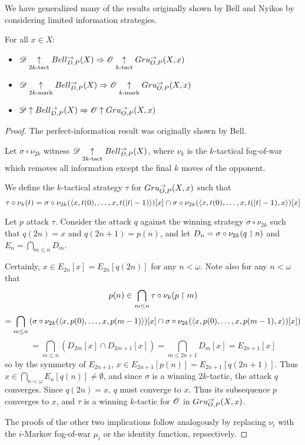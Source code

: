 We have generalized many of the results originally shown by Bell \cite{MR3239205}
and Nyikos \cite{nyikosProximalPreprint} by considering limited information
strategies.

\begin{thm}
For all $x\in X$:
  \begin{itemize}
    \item
      $\mathscr{D}\underset{2k\text{-tact}}{\uparrow} Bell_{D,P}^{\to}(X) \Rightarrow \mathscr{O} \underset{k\text{-tact}}{\uparrow} Gru_{O,P}^{\to}(X,x)$
    \item
      $\mathscr{D}\underset{2k\text{-mark}}{\uparrow} Bell_{D,P}^{\to}(X) \Rightarrow \mathscr{O} \underset{k\text{-mark}}{\uparrow} Gru_{O,P}^{\to}(X,x)$
    \item
      $\mathscr{D}\uparrow Bell_{D,P}^{\to}(X) \Rightarrow \mathscr{O} \uparrow Gru_{O,P}^{\to}(X,x)$
  \end{itemize}
\end{thm}

\begin{proof}
The perfect-information result was originally shown by Bell.

Let $\sigma\circ \nu_{2k}$ witness $\mathscr{D} \underset{2k\text{-tact}}{\uparrow} Bell_{D,P}^{\to}(X)$,
where $\nu_k$ is the $k$-tactical fog-of-war which removes all information
except the final $k$ moves of the opponent.

We define the $k$-tactical strategy $\tau$ for $Gru_{O,P}^{\to}(X,x)$ such that
  \[
    \tau\circ \nu_k(t)
      =
    \sigma\circ \nu_{2k}(\langle x,t(0),\dots,x,t(|t|-1)\rangle)[x]
      \cap
    \sigma\circ \nu_{2k}(\langle x,t(0),\dots,x,t(|t|-1),x\rangle)[x]
  \]

Let $p$ attack $\tau$. Consider the attack $q$ against the winning strategy
$\sigma\circ \nu_{2k}$ such that $q(2n)=x$ and $q(2n+1)=p(n)$, and let
$D_n=\sigma\circ \nu_{2k}(q\restriction n)$ and $E_n=\bigcap_{m\leq n}D_m$.

Certainly, $x\in E_{2n}[x]= E_{2n}[q(2n)]$ for any $n<\omega$.
Note also for any $n<\omega$ that
    \[
      p(n) \in
      \bigcap_{m\leq n}\tau\circ \nu_k(p\restriction m)
    \]
    \[
      =
      \bigcap_{m\leq n}\left(
        \sigma\circ \nu_{2k}(\langle x,p(0),\dots,x,p(m-1)\rangle)[x]\cap
        \sigma\circ \nu_{2k}(\langle x,p(0),\dots,x,p(m-1),x\rangle)[x]
      \right)
    \]
    \[
      =
      \bigcap_{m\leq n}\left(
        D_{2m}[x]\cap
        D_{2m+1}[x]
      \right) =
      \bigcap_{m\leq 2n+1} D_m[x]=E_{2n+1}[x]
    \]
so by the symmetry of $E_{2n+1}$, $x\in E_{2n+1}[p(n)]= E_{2n+1}[q(2n+1)]$.
Thus $x\in \bigcap_{n<\omega} E_n[q(n)]\not=\emptyset$, and since $\sigma$ is
a winning $2k$-tactic, the attack $q$ converges. Since $q(2n)=x$, $q$ must
converge to $x$. Thus its subsequence $p$ converges to $x$, and $\tau$ is a
winning $k$-tactic for $\mathscr{O}$ in $Gru_{O,P}^{\to}(X,x)$.

The proofs of the other two implications follow analogously by
replacing $\nu_i$ with the $i$-Markov fog-of-war $\mu_i$ or the identity
function, repsectively.
\end{proof}

